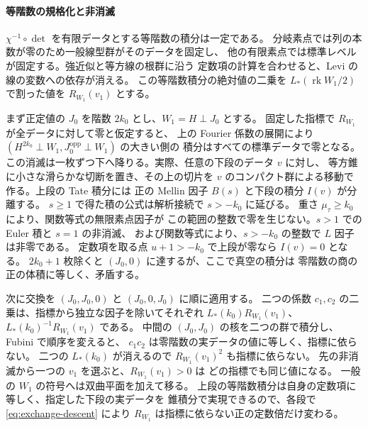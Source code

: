 \paragraph{等階数の規格化と非消滅}
\(\chi^{-1}\circ\det\) を有限データとする等階数の積分は一定である。
分岐素点では列の本数が零のため一般線型群がそのデータを固定し、
他の有限素点では標準レベルが固定する。強近似と等方線の根群に沿う
定数項の計算を合わせると、Levi の線の変数への依存が消える。
この等階数積分の絶対値の二乗を \(L_*(\operatorname{rk}W_1/2)\) で割った値を
\(R_{W_1}(v_1)\) とする。

まず正定値の \(J_0\) を階数 \(2k_0\) とし、\(W_1=H\perp J_0\) とする。
固定した指標で \(R_{W_1}\) が全データに対して零と仮定すると、
上の Fourier 係数の展開により
\((H^{2k_0}\perp W_1,J_0^{\mathrm{opp}}\perp W_1)\) の大きい側の
積分はすべての標準データで零となる。
この消滅は一枚ずつ下へ降りる。実際、任意の下段のデータ \(v\) に対し、
等方錐に小さな滑らかな切断を置き、その上の切片を
\(v\) のコンパクト群による移動で作る。上段の Tate 積分には
正の Mellin 因子 \(B(s)\) と下段の積分 \(I(v)\) が分離する。
\(s\ge1\) で得た積の公式は解析接続で \(s>-k_0\) に延びる。
重さ \(\mu_\tau\ge k_0\) により、関数等式の無限素点因子が
この範囲の整数で零を生じない。\(s>1\) での Euler 積と \(s=1\) の非消滅、
および関数等式により、\(s>-k_0\) の整数で \(L\) 因子は非零である。
定数項を取る点 \(u+1>-k_0\) で上段が零なら \(I(v)=0\) となる。
\(2k_0+1\) 枚除くと \((J_0,0)\) に達するが、ここで真空の積分は
零階数の商の正の体積に等しく、矛盾する。

次に交換を \((J_0,J_0,0)\) と \((J_0,0,J_0)\) に順に適用する。
二つの係数 \(c_1,c_2\) の二乗は、指標から独立な因子を除いてそれぞれ
\(L_*(k_0)R_{W_1}(v_1)\)、\(L_*(k_0)^{-1}R_{W_1}(v_1)\) である。
中間の \((J_0,J_0)\) の核を二つの群で積分し、Fubini で順序を変えると、
\(c_1c_2\) は零階数の実データの値に等しく、指標に依らない。
二つの \(L_*(k_0)\) が消えるので \(R_{W_1}(v_1)^2\) も指標に依らない。
先の非消滅から一つの \(v_1\) を選ぶと、\(R_{W_1}(v_1)>0\) は
どの指標でも同じ値になる。
一般の \(W_1\) の符号へは双曲平面を加えて移る。
上段の等階数積分は自身の定数項に等しく、指定した下段の実データを
錐積分で実現できるので、各段で \eqref{eq:exchange-descent} により
\(R_{W_1}\) は指標に依らない正の定数倍だけ変わる。

